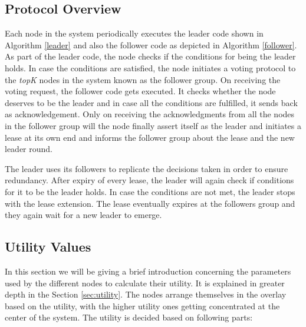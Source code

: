 \documentclass[a4paper,11pt]{kth-mag}
\begin{document}
\subsection{Protocol Overview}

Each node in the system periodically executes the leader code shown in Algorithm \ref{leader} and also the follower code as depicted in Algorithm \ref{follower}. As part of the leader code, the node checks if the conditions for being the leader holds. In case the conditions are satisfied, the node initiates a voting protocol to the \textit{topK} nodes in the system known as the follower group. On receiving the voting request, the follower code gets executed. It checks whether the node deserves to be the leader and in case all the conditions are fulfilled, it sends back as acknowledgement. Only on receiving the acknowledgments from all the nodes in the follower group will the node finally assert itself as the leader and initiates a lease at its own end and informs the follower group about the lease and the new leader round.
\par The leader uses its followers to replicate the decisions taken in order to ensure redundancy. After expiry of every lease, the leader will again check if conditions for it to be the leader holds. In case the conditions are not met, the leader stops with the lease extension. The lease eventually expires at the followers group and they again wait for a new leader to emerge.


\subsection{Utility Values}


In this section we will be giving a brief introduction concerning the parameters used by the different nodes to calculate their utility. It is explained in greater depth in the Section \ref{sec:utility}. The nodes arrange themselves in the overlay based on the utility, with the higher utility ones getting concentrated at the center of the system. The utility is decided based on following parts:
\end{document}
